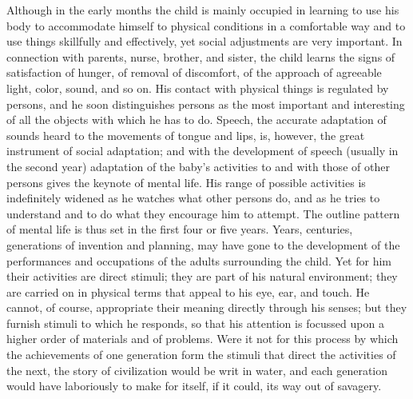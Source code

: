 \documentclass[letterpaper]{book}
\begin{document}

Although in the early months the child is mainly
occupied
in learning to use his body to accommodate himself to physical
conditions in a comfortable way and to use things skillfully and
effectively, yet social adjustments are very important. In connection
with parents, nurse, brother, and sister, the child learns the signs of
satisfaction of hunger, of removal of discomfort, of the approach of
agreeable light, color, sound, and so on. His contact with physical
things is regulated by persons, and he soon distinguishes persons as the
most important and interesting of all the objects with which he has to
do. Speech, the accurate adaptation of sounds heard to the movements of
tongue and lips, is, however, the great instrument of social adaptation;
and with the development of speech (usually in the second year)
adaptation of the baby's activities to and with those of other persons
gives the keynote of mental life. His range of possible activities is
indefinitely widened as he watches what other persons do, and as he
tries to understand and to do what they encourage him to attempt. The
outline pattern of mental life is thus set in the first four or five
years. Years, centuries, generations of invention and planning, may have
gone to the development of the performances and occupations of the
adults surrounding the child. Yet for him their activities are direct
stimuli; they are part of his natural environment; they are carried on
in physical terms that appeal to his eye, ear, and touch. He cannot, of
course, appropriate their meaning directly through his senses; but they
furnish stimuli to which he responds, so that his attention is focussed
upon a higher order of materials and of problems. Were it not for this
process by which the achievements of one generation form the stimuli
that direct the activities of the next, the story of
civilization
would be writ in water, and each generation would have laboriously to
make for itself, if it could, its way out of savagery.

\end{document}
